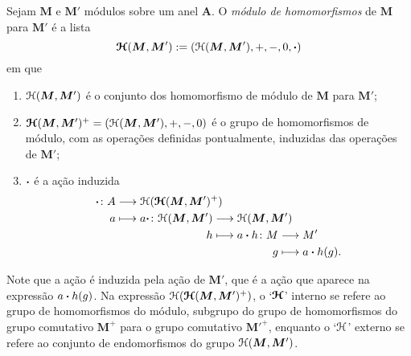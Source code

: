 \begin{definition}
Sejam $\bm M$ e $\bm M'$ módulos sobre um anel $\bm A$. O \emph{módulo de homomorfismos} de $\bm M$ para $\bm M'$ é a lista
	\begin{equation*}
	\bm{\mathcal{H}}(\bm M, \bm M') := (\mathcal{H}(\bm M, \bm M'),+,-,0,\bm{\cdot})
	\end{equation*}
em que
	\begin{enumerate}
	\item $\mathcal{H}(\bm M, \bm M')$ é o conjunto dos homomorfismo de módulo de $\bm M$ para $\bm M'$;

	\item $\bm{\mathcal{H}}(\bm M,\bm M')^+ = (\mathcal{H}(\bm M,\bm M'),+,-,0)$ é o grupo de homomorfismos de módulo, com as operações definidas pontualmente, induzidas das operações de $\bm M'$;

	\item $\bm{\cdot}$ é a ação induzida
		\begin{align*}
		\func{\pt}{A}{\Homo(\bm{\Homo}(\bm M,\bm M')^+)}{a}{
			\begin{aligned}[t]
			\func{a \pt}{\Homo(\bm M,\bm M')}{\Homo(\bm M,\bm M')}{h}{
				\begin{aligned}[t]
				\func{a \pt h}{M}{M'}{g}{a \pt h(g)}.
				\end{aligned}
			}
			\end{aligned}
		}
		\end{align*}
	\end{enumerate}
\end{definition}

Note que a ação é induzida pela ação de $\bm M'$, que é a ação que aparece na expressão $a \bm{\cdot} h(g)$. Na expressão $\mathcal{H}(\bm{\mathcal{H}}(\bm M,\bm M')^+)$, o `$\bm{\mathcal{H}}$' interno se refere ao grupo de homomorfismos do módulo, subgrupo do grupo de homomorfismos do grupo comutativo $\bm M^+$ para o grupo comutativo ${\bm M'}^+$, enquanto o `$\mathcal{H}$' externo se refere ao conjunto de endomorfismos do grupo $\mathcal{H}(\bm M,\bm M')$.

